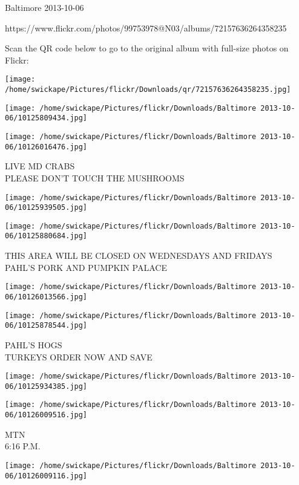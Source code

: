 \documentclass[10pt,letterpaper]{article}
\begin{document}
Baltimore 2013-10-06

https://www.flickr.com/photos/99753978@N03/albums/72157636264358235

Scan the QR code below to go to the original album with full-size photos on Flickr:

\texttt{[image: /home/swickape/Pictures/flickr/Downloads/qr/72157636264358235.jpg]}
\pagebreak

\texttt{[image: /home/swickape/Pictures/flickr/Downloads/Baltimore 2013-10-06/10125809434.jpg]}

\vspace{0.25in}
\texttt{[image: /home/swickape/Pictures/flickr/Downloads/Baltimore 2013-10-06/10126016476.jpg]}

LIVE MD CRABS\\
PLEASE DON'T TOUCH THE MUSHROOMS
\pagebreak

\texttt{[image: /home/swickape/Pictures/flickr/Downloads/Baltimore 2013-10-06/10125939505.jpg]}

\vspace{0.25in}
\texttt{[image: /home/swickape/Pictures/flickr/Downloads/Baltimore 2013-10-06/10125880684.jpg]}

THIS AREA WILL BE CLOSED ON WEDNESDAYS AND FRIDAYS\\
PAHL'S PORK AND PUMPKIN PALACE
\pagebreak

\texttt{[image: /home/swickape/Pictures/flickr/Downloads/Baltimore 2013-10-06/10126013566.jpg]}

\vspace{0.25in}
\texttt{[image: /home/swickape/Pictures/flickr/Downloads/Baltimore 2013-10-06/10125878544.jpg]}

PAHL'S HOGS\\
TURKEYS ORDER NOW AND SAVE
\pagebreak

\texttt{[image: /home/swickape/Pictures/flickr/Downloads/Baltimore 2013-10-06/10125934385.jpg]}

\vspace{0.25in}
\texttt{[image: /home/swickape/Pictures/flickr/Downloads/Baltimore 2013-10-06/10126009516.jpg]}

MTN\\
6:16 P.M.
\pagebreak

\texttt{[image: /home/swickape/Pictures/flickr/Downloads/Baltimore 2013-10-06/10126009116.jpg]}
\end{document}
